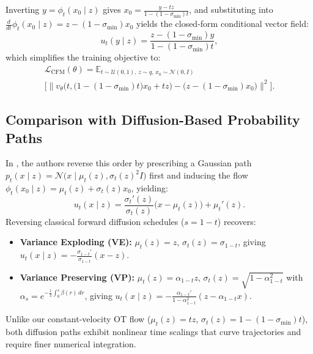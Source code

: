 Inverting $y = \phi_t(x_0 \mid z)$ gives $x_0 = \frac{y - tz}{1 - (1 - \sigma_{\min})t}$, and substituting into $\frac{d}{dt}\phi_t(x_0 \mid z) = z - (1 - \sigma_{\min})x_0$ yields the closed-form conditional vector field:
\begin{equation}
    u_t(y \mid z) = \frac{z - (1 - \sigma_{\min})y}{1 - (1 - \sigma_{\min})t},
\end{equation}
which simplifies the training objective to:
\begin{multline}
    \mathcal{L}_{\text{CFM}}(\theta) = \mathbb{E}_{t \sim \mathcal{U}(0,1), \, z \sim q, \, x_0 \sim \mathcal{N}(0, I)} \\
        \Big[ \Big\| v_\theta\Big(t, \big(1 - (1 - \sigma_{\min})t\big)x_0 + tz\Big) - \big(z - (1 - \sigma_{\min})x_0\big) \Big\|^2 \Big].
\end{multline}

\subsection{Comparison with Diffusion-Based Probability Paths}

In \cite{lipman2023flow}, the authors reverse this order by prescribing a Gaussian path $p_t(x \mid z) = \mathcal{N}\big(x \mid \mu_t(z), \sigma_t(z)^2 I\big)$ first and inducing the flow $\phi_t(x_0 \mid z) = \mu_t(z) + \sigma_t(z) x_0$, yielding:
\begin{equation}
    u_t(x \mid z) = \frac{\sigma_t'(z)}{\sigma_t(z)}\big(x - \mu_t(z)\big) + \mu_t'(z).
\end{equation}
Reversing classical forward diffusion schedules ($s = 1 - t$) recovers:
\begin{itemize}
    \item \textbf{Variance Exploding (VE):} $\mu_t(z) = z$, $\sigma_t(z) = \sigma_{1 - t}$, giving $u_t(x \mid z) = -\frac{\sigma_{1 - t}'}{\sigma_{1 - t}} (x - z)$.
    \item \textbf{Variance Preserving (VP):} $\mu_t(z) = \alpha_{1 - t} z$, $\sigma_t(z) = \sqrt{1 - \alpha_{1 - t}^2}$ with $\alpha_s = e^{-\frac{1}{2} \int_0^s \beta(r)\,dr}$, giving $u_t(x \mid z) = -\frac{\alpha_{1-t}'}{1 - \alpha_{1-t}^2}(z - \alpha_{1-t} x)$.
\end{itemize}
Unlike our constant-velocity OT flow ($\mu_t(z) = tz$, $\sigma_t(z) = 1 - (1 - \sigma_{\min})t$), both diffusion paths exhibit nonlinear time scalings that curve trajectories and require finer numerical integration.